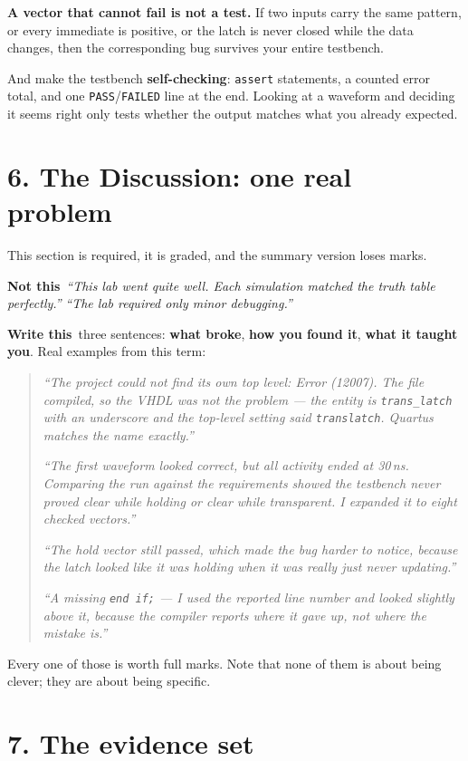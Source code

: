 \documentclass[11pt]{article}
\newcommand{\code}[1]{\texttt{#1}}
\newcommand{\yes}{\textcolor{good}{\textbf{Write this}}}
\newcommand{\no}{\textcolor{bad}{\textbf{Not this}}}
\begin{document}
\textbf{A vector that cannot fail is not a test.} If two inputs carry the same
pattern, or every immediate is positive, or the latch is never closed while the data
changes, then the corresponding bug survives your entire testbench.

And make the testbench \textbf{self-checking}: \code{assert} statements, a counted
error total, and one \code{PASS}/\code{FAILED} line at the end. Looking at a
waveform and deciding it seems right only tests whether the output matches what you
already expected.

\section*{6. The Discussion: one real problem}

This section is required, it is graded, and the summary version loses marks.

\no\ \emph{``This lab went quite well. Each simulation matched the truth table
perfectly.''} \quad \emph{``The lab required only minor debugging.''}

\yes\ three sentences: \textbf{what broke}, \textbf{how you found it}, \textbf{what
it taught you}. Real examples from this term:

\begin{quote}
\emph{``The project could not find its own top level: Error (12007). The file
compiled, so the VHDL was not the problem --- the entity is \code{trans\_latch} with
an underscore and the top-level setting said \code{translatch}. Quartus matches the
name exactly.''}

\emph{``The first waveform looked correct, but all activity ended at 30\,ns.
Comparing the run against the requirements showed the testbench never proved clear
while holding or clear while transparent. I expanded it to eight checked vectors.''}

\emph{``The hold vector still passed, which made the bug harder to notice, because
the latch looked like it was holding when it was really just never updating.''}

\emph{``A missing \code{end if;} --- I used the reported line number and looked
slightly \emph{above} it, because the compiler reports where it gave up, not where
the mistake is.''}
\end{quote}

Every one of those is worth full marks. Note that none of them is about being
clever; they are about being specific.

\section*{7. The evidence set}
\end{document}
